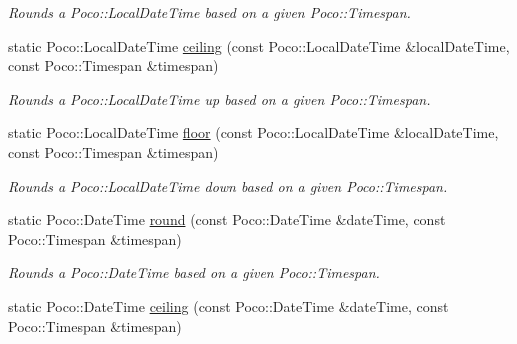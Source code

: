 \begin{DoxyCompactItemize}
\begin{DoxyCompactList}\small\item\em Rounds a Poco\-::\-Local\-Date\-Time based on a given Poco\-::\-Timespan. \end{DoxyCompactList}\item 
\hypertarget{classofx_1_1_time_1_1_utils_a7be8c358a657067c2a24e398403487a2}{static Poco\-::\-Local\-Date\-Time \hyperlink{classofx_1_1_time_1_1_utils_a7be8c358a657067c2a24e398403487a2}{ceiling} (const Poco\-::\-Local\-Date\-Time \&local\-Date\-Time, const Poco\-::\-Timespan \&timespan)}\label{classofx_1_1_time_1_1_utils_a7be8c358a657067c2a24e398403487a2}

\begin{DoxyCompactList}\small\item\em Rounds a Poco\-::\-Local\-Date\-Time up based on a given Poco\-::\-Timespan. \end{DoxyCompactList}\item 
\hypertarget{classofx_1_1_time_1_1_utils_a8ec56a3c71d4598ec610b6a51a3d814a}{static Poco\-::\-Local\-Date\-Time \hyperlink{classofx_1_1_time_1_1_utils_a8ec56a3c71d4598ec610b6a51a3d814a}{floor} (const Poco\-::\-Local\-Date\-Time \&local\-Date\-Time, const Poco\-::\-Timespan \&timespan)}\label{classofx_1_1_time_1_1_utils_a8ec56a3c71d4598ec610b6a51a3d814a}

\begin{DoxyCompactList}\small\item\em Rounds a Poco\-::\-Local\-Date\-Time down based on a given Poco\-::\-Timespan. \end{DoxyCompactList}\item 
\hypertarget{classofx_1_1_time_1_1_utils_a948c7dca6596bd4689fd0602af7091d9}{static Poco\-::\-Date\-Time \hyperlink{classofx_1_1_time_1_1_utils_a948c7dca6596bd4689fd0602af7091d9}{round} (const Poco\-::\-Date\-Time \&date\-Time, const Poco\-::\-Timespan \&timespan)}\label{classofx_1_1_time_1_1_utils_a948c7dca6596bd4689fd0602af7091d9}

\begin{DoxyCompactList}\small\item\em Rounds a Poco\-::\-Date\-Time based on a given Poco\-::\-Timespan. \end{DoxyCompactList}\item 
\hypertarget{classofx_1_1_time_1_1_utils_a1b4f279a95269b0318928e89371e3174}{static Poco\-::\-Date\-Time \hyperlink{classofx_1_1_time_1_1_utils_a1b4f279a95269b0318928e89371e3174}{ceiling} (const Poco\-::\-Date\-Time \&date\-Time, const Poco\-::\-Timespan \&timespan)}\label{classofx_1_1_time_1_1_utils_a1b4f279a95269b0318928e89371e3174}


\end{DoxyCompactItemize}
